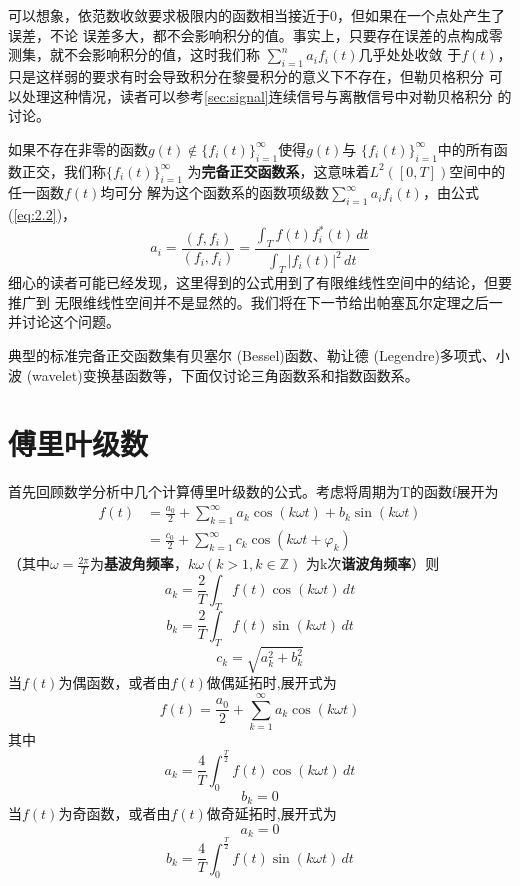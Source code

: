 \documentclass{ctexbook}
\begin{document}
可以想象，依范数收敛要求极限内的函数相当接近于0，但如果在一个点处产生了误差，不论
误差多大，都不会影响积分的值。事实上，只要存在误差的点构成零测集，就不会影响积分的值，这时我们称
$\sum_{i = 1}^{n}  a_i f_i(t)$几乎处处收敛
于$f(t)$，只是这样弱的要求有时会导致积分在黎曼积分的意义下不存在，但勒贝格积分
可以处理这种情况，读者可以参考\ref{sec:signal}连续信号与离散信号中对勒贝格积分
的讨论。

如果不存在非零的函数$g(t)\notin\{f_i(t)\}_{i=1}^{\infty}$使得$g(t)$与
$\{f_i(t)\}_{i=1}^{\infty}$中的所有函数正交，我们称$\{f_i(t)\}_{i=1}^{\infty}$
为\textbf{完备正交函数系}，这意味着$L^2([0,T])$空间中的任一函数$f(t)$均可分
解为这个函数系的函数项级数$\sum_{i = 1}^{\infty}  a_i f_i(t)$，由公式 (\ref{eq:2.2})，
\[a_i=\frac{(f,f_i)}{(f_i,f_i)}=\frac{\int_{T}f(t)f_i^*(t)\,dt}{\int_{T}|f_i(t)|^2\,dt}\]
细心的读者可能已经发现，这里得到的公式用到了有限维线性空间中的结论，但要推广到
无限维线性空间并不是显然的。我们将在下一节给出帕塞瓦尔定理之后一并讨论这个问题。

典型的标准完备正交函数集有贝塞尔 (Bessel)函数、勒让德 (Legendre)多项式、小
波 (wavelet)变换基函数等，下面仅讨论三角函数系和指数函数系。

\section{傅里叶级数}\label{sec:Fourier_Series}
首先回顾数学分析中几个计算傅里叶级数的公式。考虑将周期为T的函数f展开为
\begin{align*}
    f(t) & =\frac{a_0}{2}+\sum_{k = 1}^{\infty} a_k \cos(k\omega t)+b_k\sin(k\omega t) \\
         & =\frac{c_0}{2}+\sum_{k = 1}^{\infty} c_k\cos(k\omega t+\varphi _k)
\end{align*}
（其中$\omega =\frac{2\pi }{T}$为\textbf{基波角频率}，$k\omega (k>1,k\in \mathbb{Z} )$
为k次\textbf{谐波角频率}）则
\[a_k=\frac{2}{T}\int_T f(t)\cos(k\omega t)\,dt\]
\[b_k=\frac{2}{T}\int_T f(t)\sin(k\omega t)\,dt\]
\[c_k=\sqrt{a_k^2+b_k^2}\]
当$f(t)$为偶函数，或者由$f(t)$做偶延拓时,展开式为
\[f(t)=\frac{a_0}{2}+\sum_{k = 1}^{\infty} a_k\cos(k\omega t)\]
其中
\[a_k=\frac{4}{T}\int_{0}^{\frac{T}{2}} f(t)\cos(k\omega t)\,dt\]
\[b_k=0\]
当$f(t)$为奇函数，或者由$f(t)$做奇延拓时,展开式为
\[a_k=0\]
\[b_k=\frac{4}{T}\int_{0}^{\frac{T}{2}} f(t)\sin(k\omega t)\,dt\]
\end{document}
